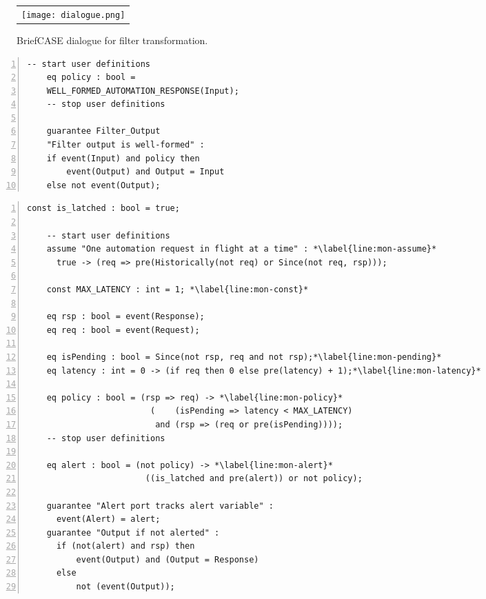 \begin{figure}
  \begin{center}
    \begin{tabular}{c}
    \texttt{[image: dialogue.png]}
    \end{tabular}
  \end{center}
  \caption{BriefCASE dialogue for filter transformation.}
  \label{fig:dialogue}
\end{figure}

\newsavebox{\flt}
\begin{lrbox}{\flt}
  \begin{lstlisting}[style=agree,numbers=left]
    -- start user definitions
    eq policy : bool = 
    WELL_FORMED_AUTOMATION_RESPONSE(Input);
    -- stop user definitions

    guarantee Filter_Output
    "Filter output is well-formed" :
    if event(Input) and policy then 
        event(Output) and Output = Input
    else not event(Output);
  \end{lstlisting}
\end{lrbox}

\newsavebox{\mntr}
\begin{lrbox}{\mntr}
  \begin{lstlisting}[style=agree,numbers=left]
    const is_latched : bool = true;

    -- start user definitions
    assume "One automation request in flight at a time" : *\label{line:mon-assume}*
      true -> (req => pre(Historically(not req) or Since(not req, rsp)));

    const MAX_LATENCY : int = 1; *\label{line:mon-const}*
        
    eq rsp : bool = event(Response);
    eq req : bool = event(Request);

    eq isPending : bool = Since(not rsp, req and not rsp);*\label{line:mon-pending}*
    eq latency : int = 0 -> (if req then 0 else pre(latency) + 1);*\label{line:mon-latency}*
    
    eq policy : bool = (rsp => req) -> *\label{line:mon-policy}*
                         (    (isPending => latency < MAX_LATENCY)   
                          and (rsp => (req or pre(isPending))));
    -- stop user definitions
    
    eq alert : bool = (not policy) -> *\label{line:mon-alert}*
                        ((is_latched and pre(alert)) or not policy);
                          
    guarantee "Alert port tracks alert variable" :
      event(Alert) = alert;
    guarantee "Output if not alerted" :
      if (not(alert) and rsp) then
          event(Output) and (Output = Response)
      else
          not (event(Output));    
  \end{lstlisting}
\end{lrbox}

